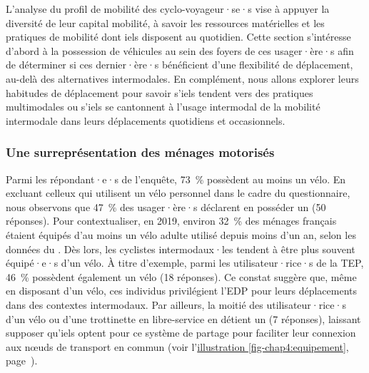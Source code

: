 \begin{refsegment}
L'analyse du profil de mobilité des cyclo-voyageur·se·s vise à appuyer la diversité de leur capital mobilité, à savoir les ressources matérielles et les pratiques de mobilité dont iels disposent au quotidien. Cette section s'intéresse d'abord à la possession de véhicules au sein des foyers de ces usager·ère·s afin de déterminer si ces dernier·ère·s bénéficient d'une flexibilité de déplacement, au-delà des alternatives intermodales. En complément, nous allons explorer leurs habitudes de déplacement pour savoir s'iels tendent vers des pratiques multimodales ou s'iels se cantonnent à l'usage intermodal de la mobilité intermodale dans leurs déplacements quotidiens et occasionnels.%

\subsubsection*{Une surreprésentation des ménages motorisés
    \label{chap4:capital-mobilite-equipement}
    }

Parmi les répondant·e·s de l'enquête, 73~\% possèdent au moins un vélo. En excluant celleux qui utilisent un vélo personnel dans le cadre du questionnaire, nous observons que 47~\% des usager·ère·s déclarent en posséder un (50 réponses). Pour contextualiser, en 2019, environ 32~\% des ménages français étaient équipés d'au moins un vélo adulte utilisé depuis moins d'un an, selon les données du \textcolor{blue}{\textcite{commissariat_general_au_developpement_durable_combien_2022}}. Dès lors, les cyclistes intermodaux·les tendent à être plus souvent équipé·e·s d'un vélo. À titre d'exemple, parmi les utilisateur·rice·s de la \acrshort{TEP}, 46~\% possèdent également un vélo (18 réponses). Ce constat suggère que, même en disposant d'un vélo, ces individus privilégient l'\acrshort{EDP} pour leurs déplacements dans des contextes intermodaux. Par ailleurs, la moitié des utilisateur·rice·s d'un vélo ou d'une trottinette en libre-service en détient un (7 réponses), laissant supposer qu'iels optent pour ce système de partage pour faciliter leur connexion aux nœuds de transport en commun (voir l'\hyperref[fig-chap4:equipement]{illustration \ref{fig-chap4:equipement}}, page~\pageref{fig-chap4:equipement}).%


\end{refsegment}
